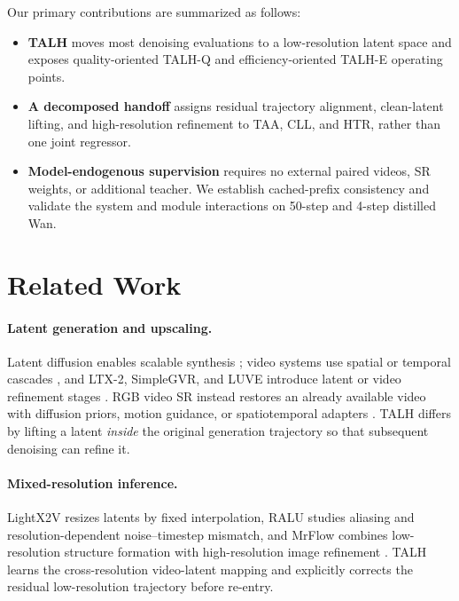 Our primary contributions are summarized as follows:

\begin{itemize}
\item
  \textbf{TALH} moves most denoising evaluations to a low-resolution latent space and exposes quality-oriented TALH-Q and efficiency-oriented TALH-E operating points.
\item
  \textbf{A decomposed handoff} assigns residual trajectory alignment, clean-latent lifting, and high-resolution refinement to TAA, CLL, and HTR, rather than one joint regressor.
\item
  \textbf{Model-endogenous supervision} requires no external paired videos, SR weights, or additional teacher. We establish cached-prefix consistency and validate the system and module interactions on 50-step and 4-step distilled Wan.
\end{itemize}

\section{Related Work}

\paragraph{Latent generation and upscaling.}
Latent diffusion enables scalable synthesis \citep{rombach2022ldm}; video systems use spatial or temporal cascades \citep{blattmann2023videoldm,ho2022imagenvideo,wang2023lavie}, and LTX-2, SimpleGVR, and LUVE introduce latent or video refinement stages \citep{hacohen2024ltxvideo,hacohen2026ltx2,xie2025simplegvr,zhao2026luve}. RGB video SR instead restores an already available video with diffusion priors, motion guidance, or spatiotemporal adapters \citep{zhou2024upscale,chen2024sateco,yang2024mgld,xu2024videogigagan}. TALH differs by lifting a latent \emph{inside} the original generation trajectory so that subsequent denoising can refine it.

\paragraph{Mixed-resolution inference.}
LightX2V resizes latents by fixed interpolation, RALU studies aliasing and resolution-dependent noise--timestep mismatch, and MrFlow combines low-resolution structure formation with high-resolution image refinement \citep{lightx2v2026,jeong2025ralu,zheng2026mrflow}. TALH learns the cross-resolution video-latent mapping and explicitly corrects the residual low-resolution trajectory before re-entry.

